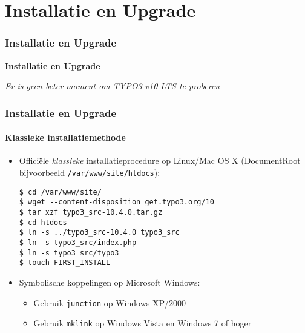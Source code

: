 %

\section{Installatie en Upgrade}
\begin{frame}[fragile]
	\frametitle{Installatie en Upgrade}

	\begin{center}\huge{\color{typo3darkgrey}\textbf{Installatie en Upgrade}}\end{center}
	\begin{center}\large{\textit{Er is geen beter moment om TYPO3 v10 LTS te proberen}}\end{center}

\end{frame}


\begin{frame}[fragile]
	\frametitle{Installatie en Upgrade}
	\framesubtitle{Klassieke installatiemethode}

	\begin{itemize}
		\item Offici\"ele \textit{klassieke} installatieprocedure op Linux/Mac OS X\newline
			(DocumentRoot bijvoorbeeld \texttt{/var/www/site/htdocs}):
\begin{lstlisting}
$ cd /var/www/site/
$ wget --content-disposition get.typo3.org/10
$ tar xzf typo3_src-10.4.0.tar.gz
$ cd htdocs
$ ln -s ../typo3_src-10.4.0 typo3_src
$ ln -s typo3_src/index.php
$ ln -s typo3_src/typo3
$ touch FIRST_INSTALL
\end{lstlisting}

		\item Symbolische koppelingen op Microsoft Windows:

		\begin{itemize}
			\item Gebruik \texttt{junction} op Windows XP/2000
			\item Gebruik \texttt{mklink} op Windows Vista en Windows 7 of hoger
		\end{itemize}

	\end{itemize}
\end{frame}

